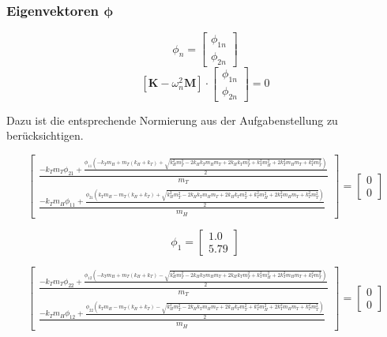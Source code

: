 \documentclass[
  letterpaper,
  DIV=11]{scrreprt}
\begin{document}
\hypertarget{eigenvektoren-mathbfphi}{%
\subsubsection{\texorpdfstring{Eigenvektoren
\(\mathbf{\phi}\)}{Eigenvektoren \textbackslash mathbf\{\textbackslash phi\}}}\label{eigenvektoren-mathbfphi}}

\[
\phi_n = \begin{bmatrix}
\phi_{1n}\\
\phi_{2n} 
\end{bmatrix}
\] \[
[\mathbf{K}-\omega_n^2 \mathbf{M}]\cdot \begin{bmatrix}
\phi_{1n}\\
\phi_{2n} 
\end{bmatrix}
=0\]

Dazu ist die entsprechende Normierung aus der Aufgabenstellung zu
berücksichtigen.

\begin{equation*}\left[\begin{matrix}\frac{- k_{T} m_{T} \phi_{21} + \frac{\phi_{11} \left(- k_{T} m_{H} + m_{T} \left(k_{H} + k_{T}\right) + \sqrt{k_{H}^{2} m_{T}^{2} - 2 k_{H} k_{T} m_{H} m_{T} + 2 k_{H} k_{T} m_{T}^{2} + k_{T}^{2} m_{H}^{2} + 2 k_{T}^{2} m_{H} m_{T} + k_{T}^{2} m_{T}^{2}}\right)}{2}}{m_{T}}\\\frac{- k_{T} m_{H} \phi_{11} + \frac{\phi_{21} \left(k_{T} m_{H} - m_{T} \left(k_{H} + k_{T}\right) + \sqrt{k_{H}^{2} m_{T}^{2} - 2 k_{H} k_{T} m_{H} m_{T} + 2 k_{H} k_{T} m_{T}^{2} + k_{T}^{2} m_{H}^{2} + 2 k_{T}^{2} m_{H} m_{T} + k_{T}^{2} m_{T}^{2}}\right)}{2}}{m_{H}}\end{matrix}\right] = \left[\begin{matrix}0\\0\end{matrix}\right]\end{equation*}

\begin{equation*}\phi_{1} = \left[\begin{matrix}1.0\\5.79\end{matrix}\right]\end{equation*}

\begin{equation*}\left[\begin{matrix}\frac{- k_{T} m_{T} \phi_{22} + \frac{\phi_{12} \left(- k_{T} m_{H} + m_{T} \left(k_{H} + k_{T}\right) - \sqrt{k_{H}^{2} m_{T}^{2} - 2 k_{H} k_{T} m_{H} m_{T} + 2 k_{H} k_{T} m_{T}^{2} + k_{T}^{2} m_{H}^{2} + 2 k_{T}^{2} m_{H} m_{T} + k_{T}^{2} m_{T}^{2}}\right)}{2}}{m_{T}}\\\frac{- k_{T} m_{H} \phi_{12} + \frac{\phi_{22} \left(k_{T} m_{H} - m_{T} \left(k_{H} + k_{T}\right) - \sqrt{k_{H}^{2} m_{T}^{2} - 2 k_{H} k_{T} m_{H} m_{T} + 2 k_{H} k_{T} m_{T}^{2} + k_{T}^{2} m_{H}^{2} + 2 k_{T}^{2} m_{H} m_{T} + k_{T}^{2} m_{T}^{2}}\right)}{2}}{m_{H}}\end{matrix}\right] = \left[\begin{matrix}0\\0\end{matrix}\right]\end{equation*}
\end{document}
